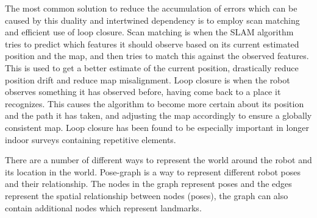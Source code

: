 The most common solution to reduce the accumulation of errors which can be caused by this duality and intertwined dependency is to employ scan matching and efficient use of loop closure\:\cite{schulz_real-time_2020}. 
Scan matching is when the SLAM algorithm tries to predict which features it should observe based on its current estimated position and the map, and then tries to match this against the observed features\:\cite{siegwart_introduction_2011}. This is used to get a better estimate of the current position, drastically reduce position drift and reduce map misalignment\:\cite{siegwart_introduction_2011}. 
Loop closure is when the robot observes something it has observed before, having come back to a place it recognizes\:\cite{siegwart_introduction_2011}\cite{chen_slam_2022}\cite{ahmed_active_2023}. This causes the algorithm to become more certain about its position and the path it has taken, and adjusting the map accordingly to ensure a globally consistent map\:\cite{siegwart_introduction_2011}\cite{corke_robotics_2023}\cite{filip_lidar_2023}\cite{chen_slam_2022}\cite{ahmed_active_2023}. 
Loop closure has been found to be especially important in longer indoor surveys containing repetitive elements\:\cite{fasiolo_comparing_2023}.

There are a number of different ways to represent the world around the robot and its location in the world.
Pose-graph is a way to represent different robot poses and their relationship\:\cite{corke_robotics_2023}. The nodes in the graph represent poses and the edges represent the spatial relationship between nodes (poses), the graph can also contain additional nodes which represent landmarks\:\cite{corke_robotics_2023}.

